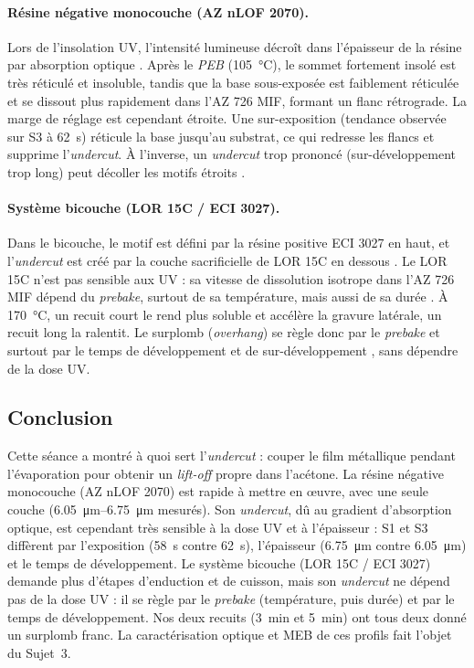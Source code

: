 \paragraph{Résine négative monocouche (AZ nLOF 2070).}
Lors de l'insolation UV, l'intensité lumineuse décroît dans l'épaisseur de la résine par absorption optique \cite{tdsnlof}. Après le \emph{PEB} (\qty{105}{\celsius}), le sommet fortement insolé est très réticulé et insoluble, tandis que la base sous-exposée est faiblement réticulée et se dissout plus rapidement dans l'AZ 726 MIF, formant un flanc rétrograde. La marge de réglage est cependant étroite. Une sur-exposition (tendance observée sur S3 à \qty{62}{\second}) réticule la base jusqu'au substrat, ce qui redresse les flancs et supprime l'\emph{undercut}. À l'inverse, un \emph{undercut} trop prononcé (sur-développement trop long) peut décoller les motifs étroits \cite{mcliftoff}.

\paragraph{Système bicouche (LOR 15C / ECI 3027).}
Dans le bicouche, le motif est défini par la résine positive ECI 3027 en haut, et l'\emph{undercut} est créé par la couche sacrificielle de LOR 15C en dessous \cite{lor}. Le LOR 15C n'est pas sensible aux UV : sa vitesse de dissolution isotrope dans l'AZ 726 MIF dépend du \emph{prebake}, surtout de sa température, mais aussi de sa durée \cite{prot2,lor}. À \qty{170}{\celsius}, un recuit court le rend plus soluble et accélère la gravure latérale, un recuit long la ralentit. Le surplomb (\emph{overhang}) se règle donc par le \emph{prebake} et surtout par le temps de développement et de sur-développement \cite{prot2}, sans dépendre de la dose UV.

\subsection{Conclusion}
Cette séance a montré à quoi sert l'\emph{undercut} : couper le film métallique pendant l'évaporation pour obtenir un \emph{lift-off} propre dans l'acétone. La résine négative monocouche (AZ nLOF 2070) est rapide à mettre en œuvre, avec une seule couche (\qtyrange{6,05}{6,75}{\micro\metre} mesurés). Son \emph{undercut}, dû au gradient d'absorption optique, est cependant très sensible à la dose UV et à l'épaisseur \cite{prot2} : S1 et S3 diffèrent par l'exposition (\qty{58}{\second} contre \qty{62}{\second}), l'épaisseur (\qty{6,75}{\micro\metre} contre \qty{6,05}{\micro\metre}) et le temps de développement. Le système bicouche (LOR 15C / ECI 3027) demande plus d'étapes d'enduction et de cuisson, mais son \emph{undercut} ne dépend pas de la dose UV : il se règle par le \emph{prebake} (température, puis durée) et par le temps de développement. Nos deux recuits (\qty{3}{\minute} et \qty{5}{\minute}) ont tous deux donné un surplomb franc. La caractérisation optique et MEB de ces profils fait l'objet du Sujet~3.
